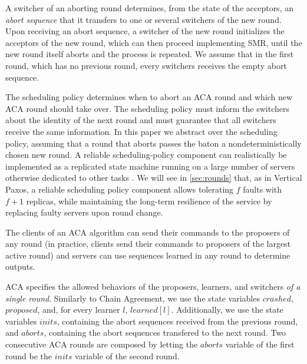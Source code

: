 A switcher of an aborting round determines, from the state of the
acceptors, an \emph{abort sequence} that it transfers to one or several
switchers of the new round.  Upon receiving an abort sequence, a switcher of the
new round initializes the acceptors of the new round, which can then
proceed implementing SMR, until the new round itself aborts and the
process is repeated. 
We assume that in the first round, which has no previous round, every 
switchers receives the empty abort sequence.

The scheduling policy determines when to abort an ACA round and which new ACA
round should take over. The scheduling policy must inform the switchers about the
identity of the next round and must guarantee that all switchers receive the
same information.  In this paper we abstract over the scheduling policy, assuming
that a round that aborts passes the baton a nondeterministically chosen new
round. A reliable scheduling-policy component can realistically be implemented
as a replicated state machine running on a large number of servers otherwise
dedicated to other tasks
\cite{LamportMalkhiZhou09VerticalPaxosPrimarybackupReplication}. We will see
 in \cref{sec:rounds} that, as in Vertical Paxos, a reliable scheduling policy component allows
tolerating $f$ faults with $f+1$ replicas, while maintaining the long-term
resilience of the service by replacing faulty servers upon round change.

The clients of an ACA algorithm can send their commands to the proposers of any round (in
practice, clients send their commands to proposers of the largest
active round) and servers can use sequences learned in any round
to determine outputs.

ACA specifies the allowed behaviors of the proposers, learners, and switchers
\emph{of a single round}. Similarly to
Chain Agreement, we use the state variables $crashed$, $proposed$,
and, for every learner $l$, $learned\left[ l \right]$.  Additionally,
we use the state variables $inits$, containing the abort sequences
received from the previous round, and $aborts$, containing the abort
sequences transfered to the next round.
Two consecutive ACA rounds are composed by letting the $aborts$ variable of the
first round be the $inits$ variable of the second round.

